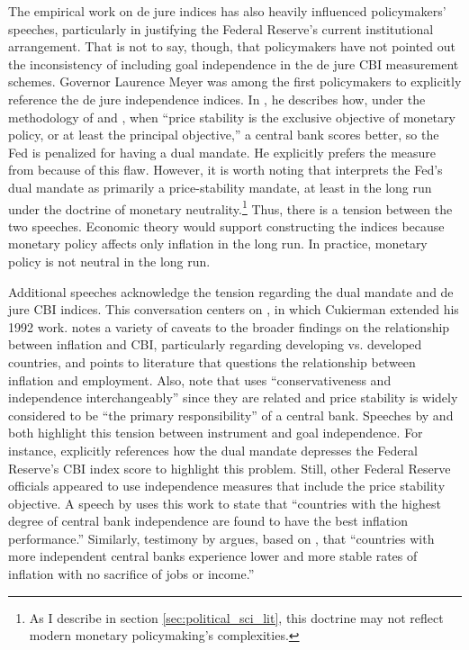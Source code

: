 \documentclass[12pt,a4paper]{article}
\begin{document}
\begin{doublespace}
The empirical work on de jure indices has also heavily influenced policymakers' speeches, particularly in justifying the Federal Reserve's current institutional arrangement. That is not to say, though, that policymakers have not pointed out the inconsistency of including goal independence in the de jure CBI measurement schemes. Governor Laurence Meyer was among the first policymakers to explicitly reference the de jure independence indices. In \textcite{meyer_politics_2000}, he describes how, under the methodology of \textcite{grilli_political_1991} and \textcite{cukierman_measuring_1992}, when ``price stability is the exclusive objective of monetary policy, or at least the principal objective,'' a central bank scores better, so the Fed is penalized for having a dual mandate. He explicitly prefers the measure from \textcite{bade_central_1988} because of this flaw. However, it is worth noting that \textcite{meyer_monetary_1996} interprets the Fed's dual mandate as primarily a price-stability mandate, at least in the long run under the doctrine of monetary neutrality.\footnote{As I describe in section \ref{sec:political_sci_lit}, this doctrine may not reflect modern monetary policymaking's complexities.} Thus, there is a tension between the two speeches. Economic theory would support constructing the indices because monetary policy affects only inflation in the long run. In practice, monetary policy is not neutral in the long run.

Additional speeches acknowledge the tension regarding the dual mandate and de jure CBI indices. This conversation centers on \textcite{cukierman_central_2008}, in which Cukierman extended his 1992 work. \textcite{cukierman_central_2008} notes a variety of caveats to the broader findings on the relationship between inflation and CBI, particularly regarding developing vs. developed countries, and points to literature that questions the relationship between inflation and employment. Also, note that \textcite[p. 723 n. 6]{cukierman_central_2008} uses ``conservativeness and independence interchangeably'' since they are related and price stability is widely considered to be ``the primary responsibility'' of a central bank. Speeches by \textcite{fischer_central_2015} and \textcite{kugler_central_2024} both highlight this tension between instrument and goal independence. For instance, \textcite{kugler_central_2024} explicitly references how the dual mandate depresses the Federal Reserve's \textcite{romelli_trends_2024} CBI index score to highlight this problem. Still, other Federal Reserve officials appeared to use independence measures that include the price stability objective. A speech by \textcite{mishkin_central_2008} uses this work to state that ``countries with the highest degree of central bank independence are found to have the best inflation performance.'' Similarly, testimony by \textcite{kohn_federal_2009} argues, based on \textcite{cukierman_central_2008}, that ``countries with more independent central banks experience lower and more stable rates of inflation with no sacrifice of jobs or income.'' 


\end{doublespace}
\end{document}
